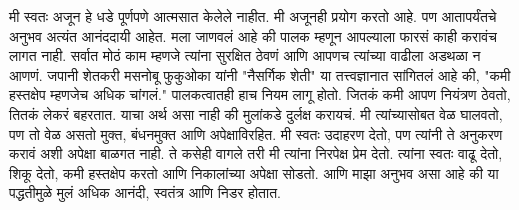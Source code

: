 मी स्वतः अजून हे धडे पूर्णपणे आत्मसात केलेले नाहीत. मी अजूनही प्रयोग करतो आहे. पण आतापर्यंतचे अनुभव अत्यंत आनंददायी आहेत. मला जाणवलं आहे की पालक म्हणून आपल्याला फारसं काही करावंच लागत नाही. सर्वात मोठं काम म्हणजे त्यांना सुरक्षित ठेवणं आणि आपणच त्यांच्या वाढीला अडथळा न आणणं.
जपानी शेतकरी मसनोबू फुकुओका यांनी "नैसर्गिक शेती" या तत्त्वज्ञानात सांगितलं आहे की, "कमी हस्तक्षेप म्हणजेच अधिक चांगलं." पालकत्वातही हाच नियम लागू होतो. जितकं कमी आपण नियंत्रण ठेवतो, तितकं लेकरं बहरतात.
याचा अर्थ असा नाही की मुलांकडे दुर्लक्ष करायचं. मी त्यांच्यासोबत वेळ घालवतो, पण तो वेळ असतो मुक्त, बंधनमुक्त आणि अपेक्षाविरहित. मी स्वतः उदाहरण देतो, पण त्यांनी ते अनुकरण करावं अशी अपेक्षा बाळगत नाही. ते कसेही वागले तरी मी त्यांना निरपेक्ष प्रेम देतो. त्यांना स्वतः वाढू देतो, शिकू देतो, कमी हस्तक्षेप करतो आणि निकालांच्या अपेक्षा सोडतो. आणि माझा अनुभव असा आहे की या पद्धतीमुळे मुलं अधिक आनंदी, स्वतंत्र आणि निडर होतात.

